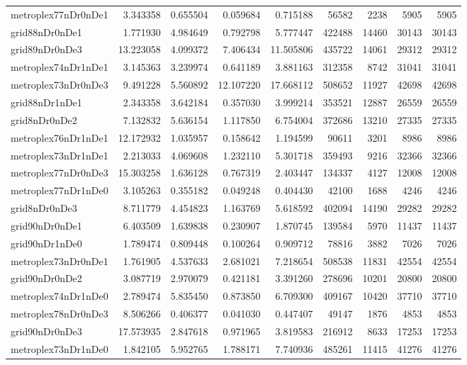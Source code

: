 \begin{longtable}{|l|r|r|r|r|r|r|r|r|}
metroplex77nDr0nDe1 & 3.343358 & 0.655504 & 0.059684 & 0.715188 & 56582 & 2238 & 5905 & 5905 \\
grid88nDr0nDe1 & 1.771930 & 4.984649 & 0.792798 & 5.777447 & 422488 & 14460 & 30143 & 30143 \\
grid89nDr0nDe3 & 13.223058 & 4.099372 & 7.406434 & 11.505806 & 435722 & 14061 & 29312 & 29312 \\
metroplex74nDr1nDe1 & 3.145363 & 3.239974 & 0.641189 & 3.881163 & 312358 & 8742 & 31041 & 31041 \\
metroplex73nDr0nDe3 & 9.491228 & 5.560892 & 12.107220 & 17.668112 & 508652 & 11927 & 42698 & 42698 \\
grid88nDr1nDe1 & 2.343358 & 3.642184 & 0.357030 & 3.999214 & 353521 & 12887 & 26559 & 26559 \\
grid8nDr0nDe2 & 7.132832 & 5.636154 & 1.117850 & 6.754004 & 372686 & 13210 & 27335 & 27335 \\
metroplex76nDr1nDe1 & 12.172932 & 1.035957 & 0.158642 & 1.194599 & 90611 & 3201 & 8986 & 8986 \\
metroplex73nDr1nDe1 & 2.213033 & 4.069608 & 1.232110 & 5.301718 & 359493 & 9216 & 32366 & 32366 \\
metroplex77nDr0nDe3 & 15.303258 & 1.636128 & 0.767319 & 2.403447 & 134337 & 4127 & 12008 & 12008 \\
metroplex77nDr1nDe0 & 3.105263 & 0.355182 & 0.049248 & 0.404430 & 42100 & 1688 & 4246 & 4246 \\
grid8nDr0nDe3 & 8.711779 & 4.454823 & 1.163769 & 5.618592 & 402094 & 14190 & 29282 & 29282 \\
grid90nDr0nDe1 & 6.403509 & 1.639838 & 0.230907 & 1.870745 & 139584 & 5970 & 11437 & 11437 \\
grid90nDr1nDe0 & 1.789474 & 0.809448 & 0.100264 & 0.909712 & 78816 & 3882 & 7026 & 7026 \\
metroplex73nDr0nDe1 & 1.761905 & 4.537633 & 2.681021 & 7.218654 & 508538 & 11831 & 42554 & 42554 \\
grid90nDr0nDe2 & 3.087719 & 2.970079 & 0.421181 & 3.391260 & 278696 & 10201 & 20800 & 20800 \\
metroplex74nDr1nDe0 & 2.789474 & 5.835450 & 0.873850 & 6.709300 & 409167 & 10420 & 37710 & 37710 \\
metroplex78nDr0nDe3 & 8.506266 & 0.406377 & 0.041030 & 0.447407 & 49147 & 1876 & 4853 & 4853 \\
grid90nDr0nDe3 & 17.573935 & 2.847618 & 0.971965 & 3.819583 & 216912 & 8633 & 17253 & 17253 \\
metroplex73nDr1nDe0 & 1.842105 & 5.952765 & 1.788171 & 7.740936 & 485261 & 11415 & 41276 & 41276 \\

\end{longtable}
